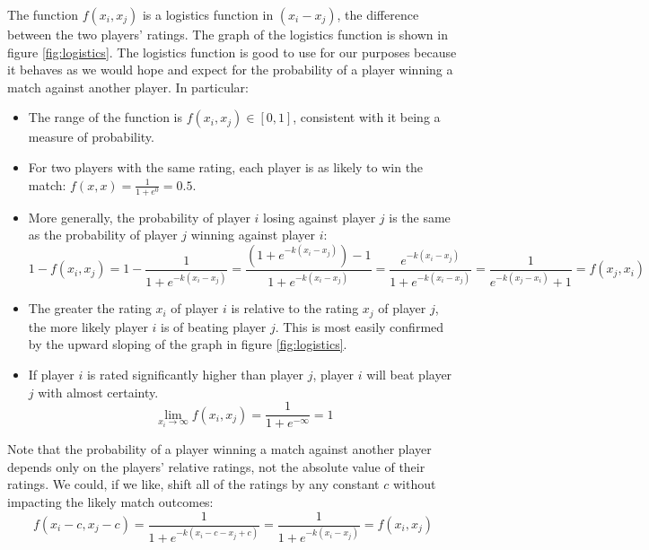 \documentclass{article}
\begin{document}
The function $f(x_i, x_j)$ is a logistics function in $(x_i - x_j)$, the
difference between the two players' ratings. The graph of the logistics
function is shown in figure \ref{fig:logistics}. The logistics function is
good to use for our purposes because it behaves as we would hope and expect
for the probability of a player winning a match against another player. In
particular:
\begin{itemize}
  \item The range of the function is $f(x_i, x_j) \in [0, 1]$, consistent with
    it being a measure of probability.

  \item For two players with the same rating, each player is as likely to win
    the match: $f(x, x) = \frac{1}{1 + e^0} = 0.5$.

  \item More generally, the probability of player $i$ losing against player
    $j$ is the same as the probability of player $j$ winning against player
    $i$:
    \begin{equation}
      1 - f(x_i, x_j) =
      1 - \frac{1}{1 + e^{-k(x_i - x_j)}} =
      \frac{(1 + e^{-k(x_i - x_j)}) - 1}{1 + e^{-k(x_i - x_j)}} =
      \frac{e^{-k(x_i - x_j)}}{1 + e^{-k(x_i - x_j)}} =
      \frac{1}{e^{-k(x_j - x_i)} + 1} = f(x_j, x_i)
    \end{equation}

  \item The greater the rating $x_i$ of player $i$ is relative to the rating
    $x_j$ of player $j$, the more likely player $i$ is of beating player $j$.
    This is most easily confirmed by the upward sloping of the graph in figure
    \ref{fig:logistics}.

  \item If player $i$ is rated significantly higher than player $j$, player
    $i$ will beat player $j$ with almost certainty.
    \begin{equation}
      \lim_{x_i \to \infty} f(x_i, x_j) = \frac{1}{1 + e^{-\infty}} = 1
    \end{equation}
\end{itemize}

Note that the probability of a player winning a match against another player
depends only on the players' relative ratings, not the absolute value of their
ratings. We could, if we like, shift all of the ratings by any constant $c$
without impacting the likely match outcomes:
\begin{equation}
  f(x_i - c, x_j - c) =
  \frac{1}{1 + e^{-k(x_i - c - x_j + c)}} =
  \frac{1}{1 + e^{-k(x_i - x_j)}} = f(x_i, x_j)
\end{equation}
\end{document}
